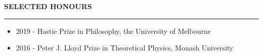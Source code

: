 \documentclass[10pt]{article}
\begin{document}
\vspace{1cm}
\begin{large}
{\bf SELECTED HONOURS} \\
\textcolor{gray}{\rule{2cm}{2mm}}
\end{large}
\begin{small}
\begin{itemize}
  \item 2019 - Hastie Prize in Philosophy, the University of Melbourne
  \item 2016 - Peter J. Lloyd Prize in Theoretical Physics, Monash University
\end{itemize}
\end{small}
\end{document}
